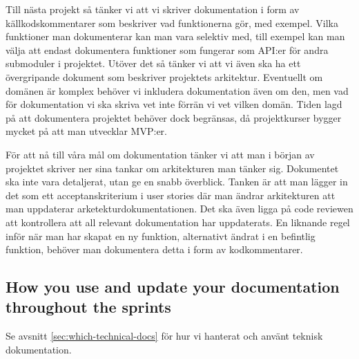 \documentclass{scrartcl}
\begin{document}

Till nästa projekt så tänker vi att vi skriver dokumentation i form av källkodskommentarer som beskriver vad funktionerna gör, med exempel.
Vilka funktioner man dokumenterar kan man vara selektiv med, till exempel kan man välja att endast dokumentera funktioner som fungerar som API:er för andra submoduler i projektet.
Utöver det så tänker vi att vi även ska ha ett övergripande dokument som beskriver projektets arkitektur.
Eventuellt om domänen är komplex behöver vi inkludera dokumentation även om den, men vad för dokumentation vi ska skriva vet inte förrän vi vet vilken domän.
Tiden lagd på att dokumentera projektet behöver dock begränsas, då projektkurser bygger mycket på att man utvecklar MVP:er.


För att nå till våra mål om dokumentation tänker vi att man i början av projektet skriver ner sina tankar om arkitekturen man tänker sig.
Dokumentet ska inte vara detaljerat, utan ge en snabb överblick.
Tanken är att man lägger in det som ett acceptanskriterium i user stories där man ändrar arkitekturen att man uppdaterar arketekturdokumentationen.
Det ska även ligga på code reviewen att kontrollera att all relevant dokumentation har uppdaterats.
En liknande regel inför när man har skapat en ny funktion, alternativt ändrat i en befintlig funktion, behöver man dokumentera detta i form av kodkommentarer.



\subsection{How you use and update your documentation throughout the sprints}

Se avsnitt \ref{sec:which-technical-docs} för hur vi hanterat och använt teknisk dokumentation.

\end{document}

